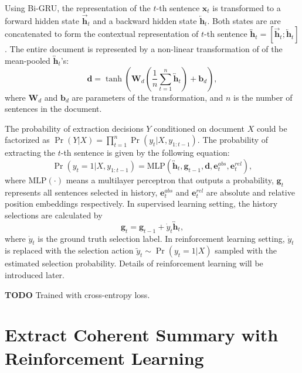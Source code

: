 \documentclass[letterpaper]{article} %
\begin{document}
	Using Bi-GRU, the representation of the $t$-th sentence $\mathbf{x}_t$ is transformed to a forward hidden state $\overrightarrow{\mathbf{h}}_t$ and a backward hidden state $\overleftarrow{\mathbf{h}}_t$. Both states are are concatenated to form the contextual representation of $t$-th sentence $\overleftrightarrow{\mathbf{h}}_t = [\overrightarrow{\mathbf{h}}_t ; \overleftarrow{\mathbf{h}}_t]$. The entire document is represented by a non-linear transformation of of the mean-pooled $\overleftrightarrow{\mathbf{h}}_t$'s:
	\[ \mathbf{d} = \tanh( \mathbf{W}_d (\frac{1}{n} \sum_{t=1}^{n} \overleftrightarrow{\mathbf{h}}_t ) + \mathbf{b}_d ) ,\]
	where $\mathbf{W}_d$ and $\mathbf{b}_d$ are parameters of the transformation, and $n$ is the number of sentences in the document. 
	
	The probability of extraction decisions $Y$ conditioned on document $X$ could be factorized as $\Pr(Y|X) = \prod_{t=1}^{n} \Pr(y_t | X, y_{1:t-1})$.
	The probability of extracting the $t$-th sentence is given by the following equation:
	\begin{equation} \label{eq:mlp}
		 \Pr(y_t=1|X, y_{1:t-1}) = \text{MLP}(\overleftrightarrow{\mathbf{h}}_t, \mathbf{g}_{t-1}, \mathbf{d}, \mathbf{e}_t^{abs}, \mathbf{e}_t^{rel} ) ,
	\end{equation}
	where $\text{MLP}(\cdot)$ means a multilayer perceptron that outputs a probability, $\mathbf{g}_t$ represents all sentences selected in history, $\mathbf{e}_t^{abs}$ and $\mathbf{e}_t^{rel}$ are absolute and relative position embeddings respectively. In supervised learning setting, the history selections are calculated by
	\begin{equation}
	\mathbf{g}_t = \mathbf{g}_{t-1} + \dot{y}_t \overleftrightarrow{\mathbf{h}}_t ,
	\end{equation}
	where $\dot{y}_t$ is the ground truth selection label. In reinforcement learning setting, $\dot{y}_t$ is replaced with the selection action $\tilde{y}_t \sim \Pr(y_t=1|X) $ sampled with the estimated selection probability. Details of reinforcement learning will be introduced later.
	
	\textbf{TODO} Trained with cross-entropy loss.
	
	\section{Extract Coherent Summary with Reinforcement Learning} 
\end{document}
